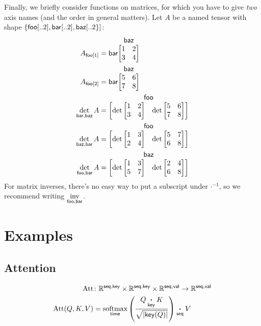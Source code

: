 \documentclass{article}
\makeatletter
\newcommand{\nmatrix}[3]{\name{#1}\begin{array}[b]{@{}c@{}}\name{#2}\\\begin{bmatrix}#3\end{bmatrix}\end{array}}
\makeatother
\begin{document}
Finally, we briefly consider functions on matrices, for which you have to give \emph{two} axis names (and the order in general matters). Let $A$ be a named tensor with shape $\{\nset{foo}{..2},\nset{bar}{..2},\nset{baz}{..2\}}$:
\begin{align*}
A_{\nidx{foo}{1}} &= \nmatrix{bar}{baz}{
  1 & 2 \\
  3 & 4
} \\
A_{\nidx{foo}{2}} &= \nmatrix{bar}{baz}{
  5 & 6 \\
  7 & 8
} \\
\nfun{bar,baz}{det} A &= \nmatrix{}{foo}{\det \begin{bmatrix} 1 & 2 \\ 3 & 4 \end{bmatrix} & \det \begin{bmatrix} 5 & 6 \\ 7 & 8 \end{bmatrix}} \\
\nfun{baz,bar}{det} A &= \nmatrix{}{foo}{\det \begin{bmatrix} 1 & 3 \\ 2 & 4 \end{bmatrix} & \det \begin{bmatrix} 5 & 7 \\ 6 & 8 \end{bmatrix}} \\
\nfun{foo,bar}{det} A &= \nmatrix{}{baz}{\det \begin{bmatrix} 1 & 3 \\ 5 & 7 \end{bmatrix} & \det \begin{bmatrix} 2 & 4 \\ 6 & 8 \end{bmatrix}}
\end{align*}
For matrix inverses, there's no easy way to put a subscript under $\mathord\cdot^{-1}$, so we recommend writing $\nfun{foo,bar}{inv}$.

\section{Examples}
\label{sec:examples}

\subsection{Attention}


\begin{align*}
  \text{Att} &\colon \mathbb{R}^{\name{seq},\name{key}} \times \mathbb{R}^{\name{seq},\name{key}} \times \mathbb{R}^{\name{seq},\name{val}} \rightarrow \mathbb{R}^{\name{seq},\name{val}} \\
  \text{Att}(Q,K,V) &= \nfun{time}{softmax} \left( \frac{Q \ndot{key} K}{\sqrt{|\name{key}(Q)|}} \right) \ndot{seq} V
\end{align*}
\end{document}
